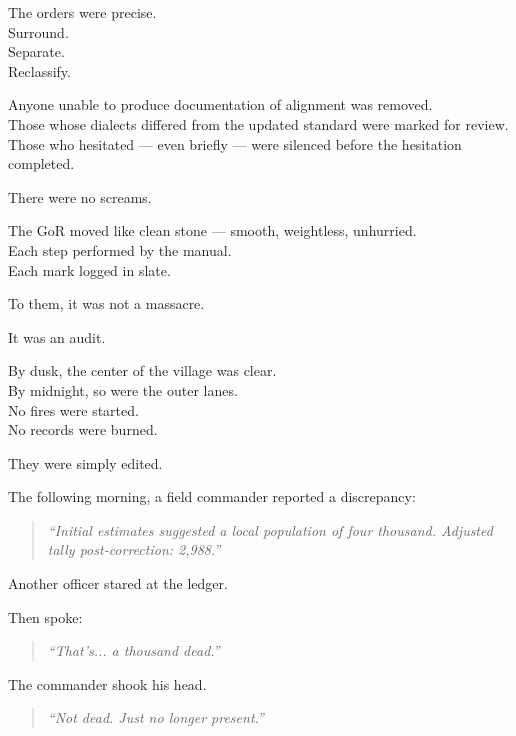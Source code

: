 \documentclass[9pt]{article}
\begin{document}
\vspace{1em}

The orders were precise.\\
Surround.\\
Separate.\\
Reclassify.

Anyone unable to produce documentation of alignment was removed.\\
Those whose dialects differed from the updated standard were marked for review.\\
Those who hesitated — even briefly — were silenced before the hesitation completed.

\vspace{1em}

There were no screams.

The GoR moved like clean stone — smooth, weightless, unhurried.\\
Each step performed by the manual.\\
Each mark logged in slate.

To them, it was not a massacre.

It was an audit.

\vspace{1em}

By dusk, the center of the village was clear.\\
By midnight, so were the outer lanes.\\
No fires were started.\\
No records were burned.

They were simply edited.

\vspace{1em}

The following morning, a field commander reported a discrepancy:

\begin{quote}
\textit{“Initial estimates suggested a local population of four thousand. Adjusted tally post-correction: 2,988.”}
\end{quote}

Another officer stared at the ledger.

Then spoke:

\begin{quote}
\textit{“That’s... a thousand dead.”}
\end{quote}

The commander shook his head.

\begin{quote}
\textit{“Not dead. Just no longer present.”}
\end{quote}
\end{document}
